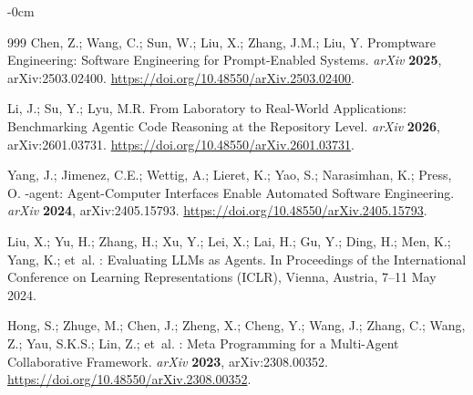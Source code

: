 \documentclass[software,article,accept,pdftex,oneauthor]{Definitions/mdpi}
\def\hl#1{#1}
\begin{document}
\begin{adjustwidth}{-\extralength}{0cm}
\begin{thebibliography}{999}
Chen, Z.; Wang, C.; Sun, W.; Liu, X.; Zhang, J.M.; Liu, Y.
\newblock Promptware Engineering: Software Engineering for Prompt-Enabled
  Systems.  \emph{arXiv} \textbf{2025},  	arXiv:2503.02400. \url{ 	
https://doi.org/10.48550/arXiv.2503.02400}.

Li, J.; Su, Y.; Lyu, M.R.
\newblock From Laboratory to Real-World Applications: Benchmarking Agentic Code
  Reasoning at the Repository Level.  \emph{arXiv} \textbf{2026},  	arXiv:2601.03731. \url{ 	
https://doi.org/10.48550/arXiv.2601.03731}.

Yang, J.; Jimenez, C.E.; Wettig, A.; Lieret, K.; Yao, S.; Narasimhan, K.;
  Press, O.
-agent: Agent-Computer Interfaces Enable Automated Software
  Engineering. \emph{arXiv}  \textbf{2024},  	arXiv:2405.15793. \url{ 	
https://doi.org/10.48550/arXiv.2405.15793}.

Liu, X.; Yu, H.; Zhang, H.; Xu, Y.; Lei, X.; Lai, H.; Gu, Y.; Ding, H.; Men,
  K.; Yang, K.;  et~al.
: Evaluating {LLMs} as Agents.
\newblock In Proceedings of the  International Conference on
  Learning Representations (ICLR), Vienna, Austria,  \hl{7--11 May} 2024.

Hong, S.; Zhuge, M.; Chen, J.; Zheng, X.; Cheng, Y.; Wang, J.; Zhang, C.; Wang,
  Z.; Yau, S.K.S.; Lin, Z.;  et~al.
: Meta Programming for a Multi-Agent Collaborative
  Framework.  \emph{arXiv}  \textbf{2023},   	arXiv:2308.00352. \url{ 	
https://doi.org/10.48550/arXiv.2308.00352}. 


\end{thebibliography}
\end{adjustwidth}
\end{document}
